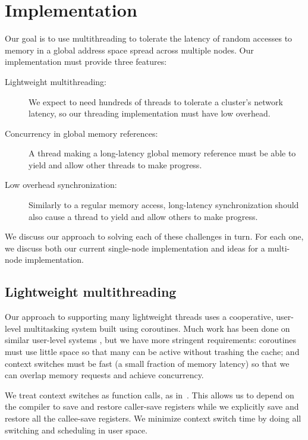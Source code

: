\documentclass[10pt,nocopyrightspace,preprint]{sigplanconf}
\begin{document}
\section{Implementation}
\label{sec:approach}
Our goal is to use multithreading to tolerate
the latency of random accesses to memory in a global address space
spread across multiple nodes.  Our implementation must provide three features:
\begin{description}
\item[Lightweight multithreading:] We expect to need hundreds of
  threads to tolerate a cluster's network latency, so our threading
  implementation must have low overhead.

\item[Concurrency in global memory references:] A thread making a
  long-latency global memory reference must be able to yield and allow
  other threads to make progress.

\item[Low overhead synchronization:] 
  Similarly to a regular memory access, long-latency synchronization
  should also cause a thread to yield and allow others to make
  progress. %
\end{description}
We discuss our approach to solving each of these challenges in
turn. For each one, we discuss both our current single-node
implementation and ideas for a multi-node implementation.

\subsection{Lightweight multithreading}

Our approach to supporting many lightweight threads uses a
cooperative, user-level multitasking system built using
coroutines. Much work has been done on similar user-level systems
\cite{ult,capriccio}, but we have more stringent requirements:
coroutines must use little space so that many can be active without
trashing the cache; and context switches must be fast (a small
fraction of memory latency) so that we can overlap memory requests and
achieve concurrency.

  We treat context switches as function calls, as
in~\cite{charm}. This allows us to depend on the compiler to save and
restore caller-save registers while we explicitly save and restore all
the callee-save registers.  We minimize context switch time by doing
all switching and scheduling in user space.
\end{document}
